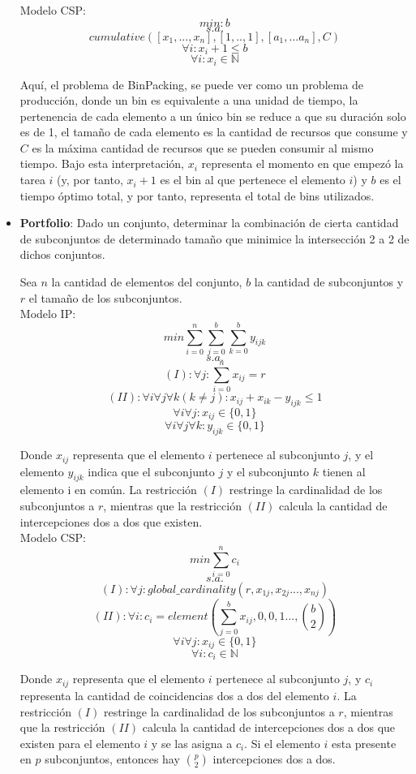 \documentclass[12pt]{report}
\begin{document}
\begin{itemize}
Modelo CSP:
$$min: b$$
$$s.a.$$
$$cumulative([x_1,...,x_n],[1,..,1],[a_1,...a_n],C)$$
$$\forall i: x_i+1\leq b$$
$$\forall i: x_i\in \mathbb{N}$$

Aquí, el problema de BinPacking, se puede ver como un problema de producción, donde un bin es equivalente a una unidad de tiempo, la pertenencia de cada elemento a un único bin se reduce a que su duración solo es de 1, el tamaño de cada elemento es la cantidad de recursos que consume y $C$ es la máxima cantidad de recursos que se pueden consumir al mismo tiempo. Bajo esta interpretación, $x_i$ representa el momento en que empezó la tarea $i$ (y, por tanto, $x_i+1$ es el bin al que pertenece el elemento $i$) y $b$ es el tiempo óptimo total, y por tanto, representa el total de bins utilizados.

\item \textbf{Portfolio}: Dado un conjunto, determinar la combinación de cierta cantidad de subconjuntos de determinado tamaño que minimice la intersección 2 a 2 de dichos conjuntos.

Sea $n$ la cantidad de elementos del conjunto, $b$ la cantidad de subconjuntos y $r$ el tamaño de los subconjuntos.\\

Modelo IP:
$$min \sum_{i=0}^n\sum_{j=0}^b\sum_{k=0}^by_{ijk}$$
$$s.a.$$
$$(I):\forall j:\sum_{i=0}^n x_{ij}=r$$
$$(II):\forall i \forall j \forall k(k\neq j):x_{ij}+x_{ik}-y_{ijk}\leq1$$
$$\forall i\forall j: x_{ij}\in\{0,1\}$$
$$\forall i\forall j\forall k: y_{ijk}\in\{0,1\}$$

Donde $x_{ij}$ representa que el elemento $i$ pertenece al subconjunto $j$, y el elemento $y_{ijk}$ indica que el subconjunto $j$ y el subconjunto $k$ tienen al elemento i en común. La restricción $(I)$ restringe la cardinalidad de los subconjuntos a $r$, mientras que la restricción $(II)$ calcula la cantidad de intercepciones dos a dos que existen.\\

Modelo CSP:
$$min \sum_{i=0}^n c_i$$
$$s.a.$$
$$ (I):\forall j:global\_cardinality(r,x_{1j},x_{2j}...,x_{nj})$$
$$ (II):\forall i:c_i=element(\sum_{j=0}^b x_{ij},0,0,1...,\binom{b}{2})$$
$$\forall i\forall j: x_{ij}\in\{0,1\}$$
$$\forall i: c_i\in \mathbb{N}$$

Donde $x_{ij}$ representa que el elemento $i$ pertenece al subconjunto $j$, y $c_i$ representa la cantidad de coincidencias dos a dos del elemento $i$. La restricción $(I)$ restringe la cardinalidad de los subconjuntos a $r$, mientras que la restricción $(II)$ calcula la cantidad de intercepciones dos a dos que existen para el elemento $i$ y se las asigna a $c_i$. Si el elemento $i$ esta presente en $p$ subconjuntos, entonces hay $\binom{p}{2}$ intercepciones dos a dos.


\end{itemize}
\end{document}
